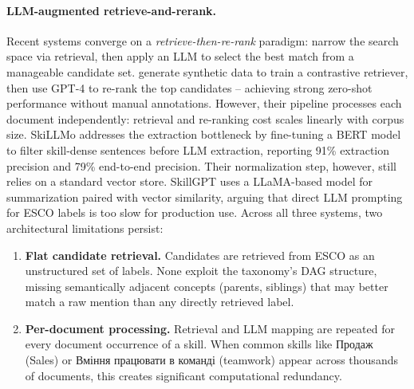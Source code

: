\documentclass[11pt]{article}
\newcommand{\uk}[1]{{\fontencoding{T2A}\selectfont #1}}
\begin{document}
\paragraph{LLM-augmented retrieve-and-rerank.}
Recent systems converge on a \emph{retrieve-then-re-rank} paradigm: narrow the search space via retrieval, then apply an LLM to select the best match from a manageable candidate set. \citet{Clavi2023} generate synthetic data to train a contrastive retriever, then use GPT-4 to re-rank the top candidates -- achieving strong zero-shot performance without manual annotations. However, their pipeline processes each document independently: retrieval and re-ranking cost scales linearly with corpus size. SkiLLMo \citep{Malandri2025} addresses the extraction bottleneck by fine-tuning a BERT model to filter skill-dense sentences before LLM extraction, reporting 91\% extraction precision and 79\% end-to-end precision. Their normalization step, however, still relies on a standard vector store. SkillGPT \citep{li2023skillgptrestfulapiservice} uses a LLaMA-based model for summarization paired with vector similarity, arguing that direct LLM prompting for ESCO labels is too slow for production use. Across all three systems, two architectural limitations persist:

\begin{enumerate}
\setlength\itemsep{0.2em}
\item \textbf{Flat candidate retrieval.} Candidates are retrieved from ESCO as an unstructured set of labels. None exploit the taxonomy's DAG structure, missing semantically adjacent concepts (parents, siblings) that may better match a raw mention than any directly retrieved label.

\item \textbf{Per-document processing.} Retrieval and LLM mapping are repeated for every document occurrence of a skill. When common skills like \uk{Продаж} (Sales) or \uk{Вміння працювати в команді} (teamwork) appear across thousands of documents, this creates significant computational redundancy.
\end{enumerate}
\end{document}
